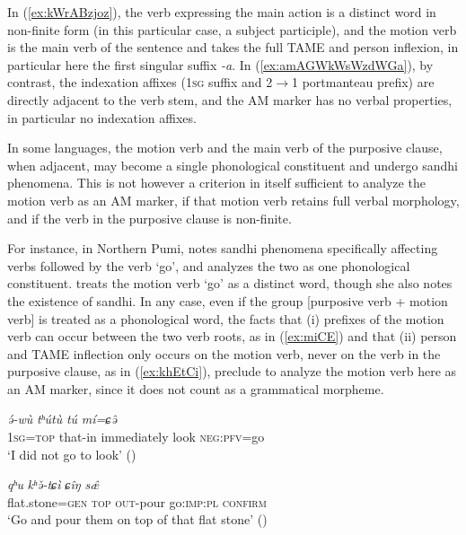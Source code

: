 \documentclass[oneside,a4paper,11pt]{article}
\newcommand{\ipa}[1]{{\phon\textit{#1}}}
\begin{document}
In (\ref{ex:kWrABzjoz}), the verb expressing the main action is a distinct word in non-finite form (in this particular case, a subject participle), and the motion verb is the main verb of the sentence and takes the full TAME and person inflexion, in particular here the first singular suffix \ipa{-a}. In (\ref{ex:amAGWkWsWzdWGa}), by contrast, the indexation affixes (\textsc{1sg} suffix and 2$\rightarrow$1 portmanteau prefix) are directly adjacent to the verb stem, and the AM marker has no verbal properties, in particular no indexation affixes.

In some languages, the motion verb and the main verb of the purposive clause, when adjacent, may become  a single phonological constituent and undergo sandhi phenomena. This is not however a criterion in itself sufficient to analyze the motion verb as an AM marker, if that motion verb retains full verbal morphology, and if the verb in the purposive clause is non-finite.

For instance, in Northern Pumi, \citet[§ 5.2]{jacques11pumi.tone} notes sandhi phenomena specifically affecting verbs followed by the verb `go', and analyzes the two as one phonological constituent. \citet{daudey14grammar} treats the motion verb `go' as a distinct word, though she also notes the existence of sandhi. In any case, even if the group [purposive verb + motion verb] is treated as a phonological word, the facts that (i) prefixes of the motion verb can occur between the two verb roots, as in (\ref{ex:miCE}) and that (ii) person and TAME inflection only occurs on the motion verb, never on the verb in the purposive clause, as in (\ref{ex:khEtCi}), preclude to analyze the motion verb here as an AM marker, since it does not count as a grammatical morpheme.
 

\begin{exe}
\ex \label{ex:miCE}
 \gll   \ipa{ɐ́=bú} \ipa{ə́-wù}  \ipa{tʰútù} \ipa{tú} \ipa{mí=ɕə̂} \\
 \textsc{1sg}=\textsc{top} that-in   immediately look \textsc{neg}:\textsc{pfv}=go \\
 \glt ‘I did not go to look' (\citealt[364]{daudey14grammar})
\end{exe}

\begin{exe}
\ex \label{ex:khEtCi}
 \gll  \ipa{ɡʉtɑpǽŋ=ɡæ}  \ipa{qʰu}  \ipa{kʰə̌-tɕì}  \ipa{ɕîŋ}  \ipa{sæ̂} \\
flat.stone=\textsc{gen} \textsc{top} \textsc{out}-pour go:\textsc{imp}:\textsc{pl} \textsc{confirm}   \\
\glt `Go and pour them on top of that flat stone' (\citealt[568]{daudey14grammar})
\end{exe}
\end{document}
